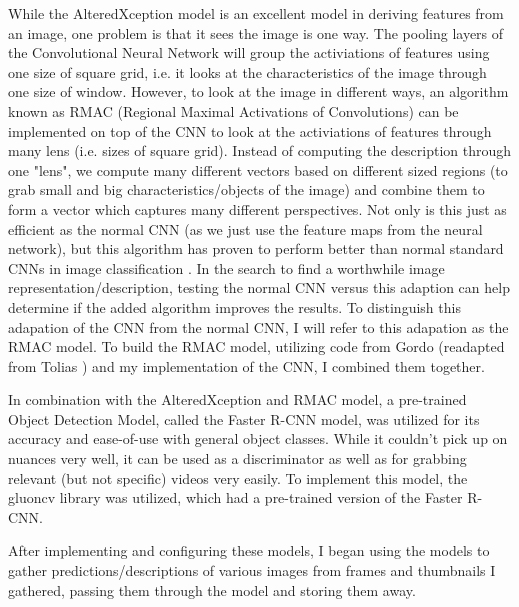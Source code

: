 \documentclass[10pt,twocolumn]{article}
\begin{document}
While the AlteredXception model is an excellent model in deriving features from an image, one problem is that it sees the image is one way. The pooling layers of the Convolutional Neural Network will group the activiations of features using one size of square grid, i.e. it looks at the characteristics of the image through one size of window. However, to look at the image in different ways, an algorithm known as RMAC (Regional Maximal Activations of Convolutions) can be implemented on top of the CNN to look at the activiations of features through many lens (i.e. sizes of square grid). Instead of computing the description through one "lens", we compute many different vectors based on different sized regions (to grab small and big characteristics/objects of the image) and combine them to form a vector which captures many different perspectives. Not only is this just as efficient as the normal CNN (as we just use the feature maps from the neural network), but this algorithm has proven to perform better than normal standard CNNs in image classification \cite{Tolias2016}. In the search to find a worthwhile image representation/description, testing the normal CNN versus this adaption can help determine if the added algorithm improves the results. To distinguish this adapation of the CNN from the normal CNN, I will refer to this adapation as the RMAC model. To build the RMAC model, utilizing code from Gordo \cite{Gordo2016} (readapted from Tolias \cite{Tolias2016}) and my implementation of the CNN, I combined them together.

In combination with the AlteredXception and RMAC model, a pre-trained Object Detection Model, called the Faster R-CNN model, was utilized for its accuracy and ease-of-use with general object classes. While it couldn't pick up on nuances very well, it can be used as a discriminator as well as for grabbing relevant (but not specific) videos very easily. To implement this model, the gluoncv library was utilized, which had a pre-trained version of the Faster R-CNN.

After implementing and configuring these models, I began using the models to gather predictions/descriptions of various images from frames and thumbnails I gathered, passing them through the model and storing them away.
\end{document}
